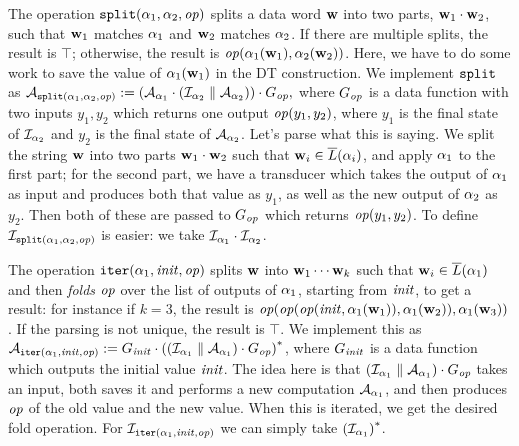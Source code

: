 The operation $\texttt{split}(\alpha_1, \alpha_2, \mathit{op})$ splits a data word $\mathbf{w}$ into two parts, $\mathbf{w}_1 \cdot \mathbf{w}_2$, such that $\mathbf{w}_1$ matches $\alpha_1$ and $\mathbf{w}_2$ matches $\alpha_2$. If there are multiple splits, the result is $\top$; otherwise, the result is $\mathit{op}(\alpha_1(\mathbf{w}_1),\alpha_2(\mathbf{w}_2))$.
Here, we have to do some work to save the value of $\alpha_1(\mathbf{w}_1)$ in the DT construction. We implement $\texttt{split}$ as
$\mathcal{A}_{\texttt{split}(\alpha_1, \alpha_2,\mathit{op})}
:= (\mathcal{A}_{\alpha_1} \cdot (\mathcal{I}_{\alpha_2} \; \| \; \mathcal{A}_{\alpha_2})) \cdot G_{\mathit{op}},$
where $G_{\mathit{op}}$ is a data function with two inputs $y_1, y_2$ which returns one output $\mathit{op}(y_1,y_2)$, where $y_1$ is the final state of $\mathcal{I}_{\alpha_2}$ and $y_2$ is the final state of $\mathcal{A}_{\alpha_2}$. Let's parse what this is saying. We split the string $\mathbf{w}$ into two parts $\mathbf{w}_1 \cdot \mathbf{w}_2$ such that $\mathbf{w}_i \in \overline{L}(\alpha_i)$, and apply $\alpha_1$ to the first part; for the second part, we have a transducer which takes the output of $\alpha_1$ as input and produces both that value as $y_1$, as well as the new output of $\alpha_2$ as $y_2$. Then both of these are passed to $G_{\mathit{op}}$ which returns $\mathit{op}(y_1, y_2)$. To define $\mathcal{I}_{\texttt{split}(\alpha_1,\alpha_2,\mathit{op})}$ is easier: we take $\mathcal{I}_{\alpha_1} \cdot \mathcal{I}_{\alpha_2}$.

The operation $\texttt{iter}(\alpha_1,\mathit{init},\mathit{op})$ splits $\mathbf{w}$ into $\mathbf{w}_1 \cdots \mathbf{w}_k$ such that $\mathbf{w}_i \in \overline{L}(\alpha_1)$ and then \emph{folds} $\mathit{op}$ over the list of outputs of $\alpha_1$, starting from $\mathit{init}$, to get a result: for instance if $k=3$, the result is $\mathit{op}(\mathit{op}(\mathit{op}(\mathit{init},\alpha_1(\mathbf{w}_1)),\alpha_1(\mathbf{w}_2)),\alpha_1(\mathbf{w}_3))$. If the parsing is not unique, the result is $\top$. We implement this as
$\mathcal{A}_{\texttt{iter}(\alpha_1,\mathit{init},\mathit{op})} :=
G_{\mathit{init}} \cdot {{\left((\mathcal{I}_{\alpha_1} \; \| \; \mathcal{A}_{\alpha_1}) \cdot G_{\mathit{op}}\right)}^{*}}$,
where $G_{\mathit{init}}$ is a data function which outputs the initial value $\mathit{init}$.
The idea here is that $(\mathcal{I}_{\alpha_1} \; \| \; \mathcal{A}_{\alpha_1}) \cdot G_{\mathit{op}}$ takes an input, both saves it and performs a new computation $\mathcal{A}_{\alpha_1}$, and then produces $\mathit{op}$ of the old value and the new value. When this is iterated, we get the desired fold operation.
For $\mathcal{I}_{\texttt{iter}(\alpha_1,\mathit{init},\mathit{op})}$ we can simply take ${{(\mathcal{I}_{\alpha_1})}^{*}}$.


